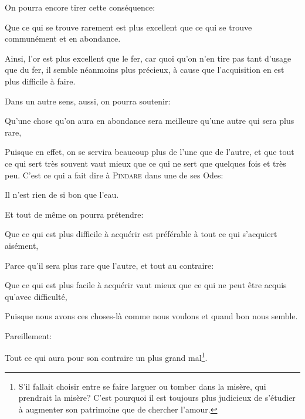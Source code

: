 \bigbreak

On pourra encore tirer cette conséquence:

\begin{lieu}
	Que ce qui se trouve rarement est plus excellent que ce qui se trouve communément et en abondance.
\end{lieu}

Ainsi, l'or est plus excellent que le fer, car quoi qu'on n'en tire pas tant d'usage que du fer, il semble néanmoins plus
précieux, à cause que l'acquisition en est plus difficile à faire.

Dans un autre sens, aussi, on pourra soutenir:

\begin{lieu}
	Qu'une chose qu'on aura en abondance sera meilleure qu'une autre qui sera plus rare,
\end{lieu}

Puisque en effet, on se servira beaucoup plus de l'une que de l'autre, et que tout ce qui sert très souvent vaut mieux que
ce qui ne sert que quelques fois et très peu. C'est ce qui a fait dire à \textsc{Pindare} dans une de ses Odes:

\begin{emphpar}
	Il n'est rien de si bon que l'eau.
\end{emphpar}

\bigbreak

Et tout de même on pourra prétendre:

\begin{lieu}
	Que ce qui est plus difficile à acquérir est préférable à tout ce qui s'acquiert aisément,
\end{lieu}

Parce qu'il sera plus rare que l'autre, et tout au contraire:

\begin{lieu}
	Que ce qui est plus facile à acquérir vaut mieux que ce qui ne peut être acquis qu'avec difficulté,
\end{lieu}

Puisque nous avons ces choses-là comme nous voulons et quand bon nous semble.

\bigbreak

Pareillement:

\begin{lieu}
	Tout ce qui aura pour son contraire un plus grand mal\footnote{S'il fallait choisir entre se faire larguer
	ou tomber dans la misère, qui prendrait la misère? C'est pourquoi il est toujours plus judicieux de s'étudier
	à augmenter son patrimoine que de chercher l'amour.}.
\end{lieu}

